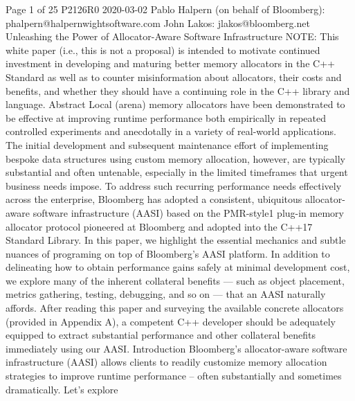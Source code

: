 Page 1 of 25
P2126R0
2020-03-02
Pablo Halpern (on behalf of Bloomberg): phalpern@halpernwightsoftware.com
John Lakos: jlakos@bloomberg.net
Unleashing the Power of
Allocator-Aware Software Infrastructure
NOTE: This white paper (i.e., this is not a proposal) is intended to motivate continued
investment in developing and maturing better memory allocators in the C++ Standard as
well as to counter misinformation about allocators, their costs and benefits, and whether
they should have a continuing role in the C++ library and language.
Abstract
Local (arena) memory allocators have been demonstrated to be effective at
improving runtime performance both empirically in repeated controlled
experiments and anecdotally in a variety of real-world applications. The initial
development and subsequent maintenance effort of implementing bespoke data
structures using custom memory allocation, however, are typically substantial
and often untenable, especially in the limited timeframes that urgent business
needs impose. To address such recurring performance needs effectively across
the enterprise, Bloomberg has adopted a consistent, ubiquitous allocator-aware
software infrastructure (AASI) based on the PMR-style1 plug-in memory
allocator protocol pioneered at Bloomberg and adopted into the C++17
Standard Library.
In this paper, we highlight the essential mechanics and subtle nuances of
programing on top of Bloomberg’s AASI platform. In addition to delineating how
to obtain performance gains safely at minimal development cost, we explore
many of the inherent collateral benefits — such as object placement, metrics
gathering, testing, debugging, and so on — that an AASI naturally affords. After
reading this paper and surveying the available concrete allocators (provided in
Appendix A), a competent C++ developer should be adequately equipped to
extract substantial performance and other collateral benefits immediately using
our AASI.
Introduction
Bloomberg’s allocator-aware software infrastructure (AASI) allows clients to
readily customize memory allocation strategies to improve runtime
performance – often substantially and sometimes dramatically. Let’s explore

